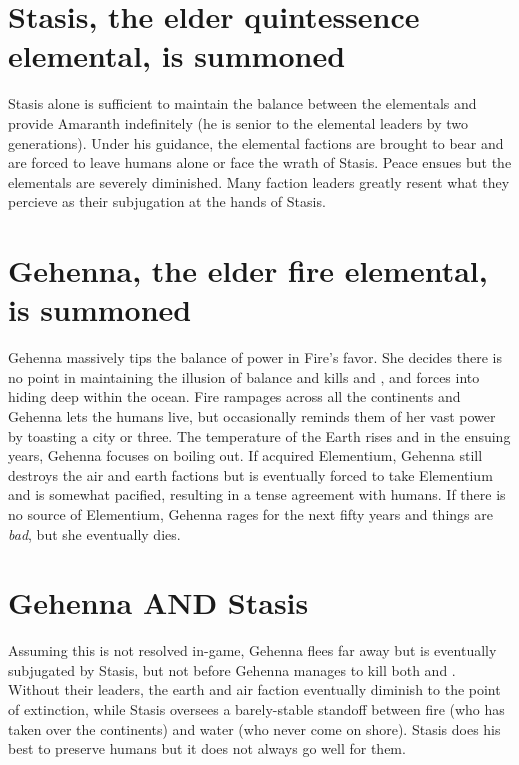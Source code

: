 \documentclass[green]{elementals}
\begin{document}
\section{Stasis, the elder quintessence elemental, is summoned}

Stasis alone is sufficient to maintain the balance between the elementals and provide Amaranth indefinitely (he is senior to the elemental leaders by two generations). Under his guidance, the elemental factions are brought to bear and are forced to leave humans alone or face the wrath of Stasis. Peace ensues but the elementals are severely diminished. Many faction leaders greatly resent what they percieve as their subjugation at the hands of Stasis.

\section{Gehenna, the elder fire elemental, is summoned}

Gehenna massively tips the balance of power in Fire's favor. She decides there is no point in maintaining the illusion of balance and kills \cKing{} and \cEarthKing{}, and forces \cWaterQueen{} into hiding deep within the ocean. Fire rampages across all the continents and Gehenna lets the humans live, but occasionally reminds them of her vast power by toasting a city or three. The temperature of the Earth rises and in the ensuing years, Gehenna focuses on boiling \cWaterQueen{} out. If \cScientist{} acquired Elementium, Gehenna still destroys the air and earth factions but is eventually forced to take Elementium and is somewhat pacified, resulting in a tense agreement with humans. If there is no source of Elementium, Gehenna rages for the next fifty years and things are \emph{bad}, but she eventually dies.

\section{Gehenna AND Stasis}

Assuming this is not resolved in-game, Gehenna flees far away but is eventually subjugated by Stasis, but not before Gehenna manages to kill both \cKing{} and \cEarthKing{}. Without their leaders, the earth and air faction eventually diminish to the point of extinction, while Stasis oversees a barely-stable standoff between fire (who has taken over the continents) and water (who never come on shore). Stasis does his best to preserve humans but it does not always go well for them.
\end{document}
